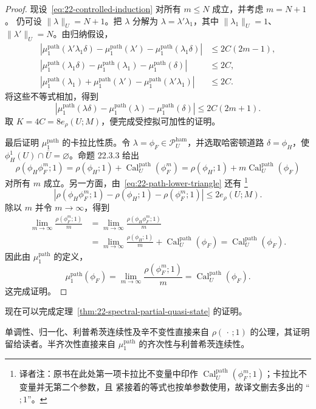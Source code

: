 \begin{proof}
现设~\eqref{eq:22-controlled-induction} 对所有 $m\leq N$ 成立，并考虑 $m=N+1$。
仍可设 $\lVert\lambda\rVert_U=N+1$。把 $\lambda$ 分解为
$\lambda=\lambda'\lambda_1$，其中 $\lVert\lambda_1\rVert_U=1$、
$\lVert\lambda'\rVert_U=N$。由归纳假设，
\begin{align*}
 |\mu_1^{\mathrm{path}}(\lambda'\lambda_1\delta)
 -\mu_1^{\mathrm{path}}(\lambda')-\mu_1^{\mathrm{path}}(\lambda_1\delta)|
 &\leq2C(2m-1),\\
 |\mu_1^{\mathrm{path}}(\lambda_1\delta)-\mu_1^{\mathrm{path}}(\lambda_1)
 -\mu_1^{\mathrm{path}}(\delta)|&\leq2C,\\
 |\mu_1^{\mathrm{path}}(\lambda_1)+\mu_1^{\mathrm{path}}(\lambda')
 -\mu_1^{\mathrm{path}}(\lambda'\lambda_1)|&\leq2C.
\end{align*}
将这些不等式相加，得到
\[
 |\mu_1^{\mathrm{path}}(\lambda\delta)-\mu_1^{\mathrm{path}}(\lambda)
 -\mu_1^{\mathrm{path}}(\delta)|\leq2C(2m+1).
\]
取 $K=4C=8e_\rho(U;M)$，便完成受控拟可加性的证明。

最后证明 $\mu_1^{\mathrm{path}}$ 的卡拉比性质。令
$\lambda=\phi_F\in\mathcal P_U^{\mathrm{ham}}$，并选取哈密顿道路
$\delta=\phi_H$，使 $\phi_H^1(U)\cap\overline U=\varnothing$。命题 22.3.3 给出
\[
 \rho(\phi_H\phi_F^m;1)=\rho(\phi_H;1)
 +\operatorname{Cal}_U^{\mathrm{path}}(\phi_F^m)
 =\rho(\phi_H;1)+m\operatorname{Cal}_U^{\mathrm{path}}(\phi_F)
\]
对所有 $m$ 成立。另一方面，由~\eqref{eq:22-path-lower-triangle} 还有
\footnote{译者注：原书在此处第一项卡拉比不变量中印作
$\operatorname{Cal}_U^{\mathrm{path}}(\phi_F^m;1)$；卡拉比不变量并无第二个参数，且
紧接着的等式也按单参数使用，故译文删去多出的 ``$;1$''。}
\[
 |\rho(\phi_H\phi_F^m;1)-\rho(\phi_H;1)-\rho(\phi_F^m;1)|
 \leq2e_\rho(U;M).
\]
除以 $m$ 并令 $m\to\infty$，得到
\begin{align*}
 \lim_{m\to\infty}\frac{\rho(\phi_F^m;1)}m
 &=\lim_{m\to\infty}\frac{\rho(\phi_H\phi_F^m;1)}m\\
 &=\lim_{m\to\infty}\frac{\rho(\phi_H;1)}m
 +\operatorname{Cal}_U^{\mathrm{path}}(\phi_F)
 =\operatorname{Cal}_U^{\mathrm{path}}(\phi_F).
\end{align*}
因此由 $\mu_1^{\mathrm{path}}$ 的定义，
\[
 \mu_1^{\mathrm{path}}(\phi_F)
 =\lim_{m\to\infty}\frac{\rho(\phi_F^m;1)}m
 =\operatorname{Cal}_U^{\mathrm{path}}(\phi_F).
\]
这完成证明。
\end{proof}

现在可以完成定理~\ref{thm:22-spectral-partial-quasi-state} 的证明。

单调性、归一化、利普希茨连续性及辛不变性直接来自
$\rho(\,\cdot\,;1)$ 的公理，其证明留给读者。半齐次性直接来自
$\mu_1^{\mathrm{path}}$ 的齐次性与利普希茨连续性。

